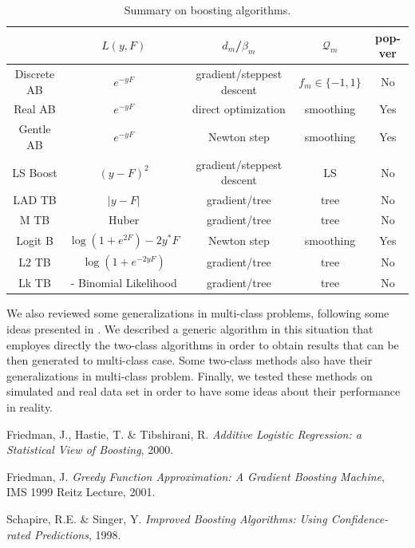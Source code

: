 \documentclass[a4paper,twoside,12pt]{article}
\begin{document}
\begin{table}\centering
    \begin{tabular}{|c|c|c|c|c|}
        \hline
          & $L(y,F)$ & $d_m$/$\beta_m$ & $\mathcal{Q}_m$ & pop-ver \\
         \hline
         Discrete AB & $e^{-yF}$ & gradient/steppest descent & $f_m \in \{-1, 1\}$ & No \\
         \hline
         Real AB & $e^{-yF}$ & direct optimization & smoothing & Yes \\
         \hline
         Gentle AB & $e^{-yF}$ & Newton step & smoothing & Yes \\
         \hline
         LS Boost & $(y-F)^2$ & gradient/steppest descent & LS & No \\
         \hline
         LAD TB & $\vert y - F\vert$ & gradient/tree & tree & No \\
         \hline
         M TB & Huber & gradient/tree & tree & No \\
         \hline
         Logit B & $\log(1+e^{2F}) - 2y^{*}F$ & Newton step & smoothing & Yes \\
         \hline
         L2 TB & $\log(1+e^{-2yF})$ & gradient/tree & tree & No \\
         \hline
         Lk TB & - Binomial Likelihood & gradient/tree & tree & No \\
         \hline
    \end{tabular}
    \caption{Summary on boosting algorithms.}
    \label{sum_tab}
\end{table}

We also reviewed some generalizations in multi-class problems, following some ideas presented in \cite{SchaAndSin1998}. We described a generic algorithm in this situation that employes directly the two-class algorithms in order to obtain results that can be then generated to multi-class case. Some two-class methods also have their generalizations in multi-class problem. Finally, we tested these methods on simulated and real data set in order to have some ideas about their performance in reality.

\begin{thebibliography}{9999}%
Friedman, J., Hastie, T. \& Tibshirani, R. \textsl{Additive Logistic Regression: a Statistical View of Boosting}, 2000.

Friedman, J. \textsl{Greedy Function Approximation: A Gradient Boosting Machine}, IMS 1999 Reitz Lecture, 2001.

Schapire, R.E. \& Singer, Y. \textsl{Improved Boosting Algorithms: Using Confidence-rated Predictions}, 1998.

\end{thebibliography}
\end{document}
